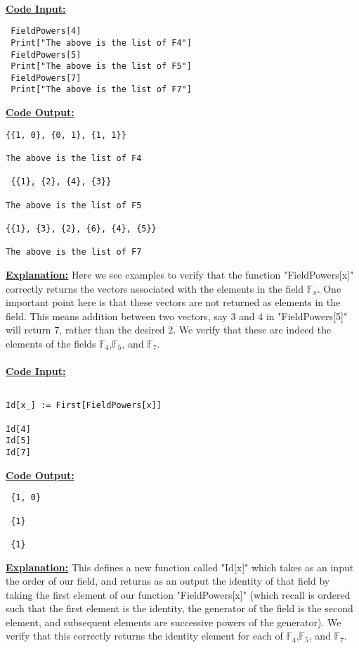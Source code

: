 \documentclass[11pt]{article}
\theoremstyle{plain}
\theoremstyle{definition}
\begin{document}
 \\
 \textbf{\underline{Code Input:}}
 \begin{verbatim}
 FieldPowers[4]
 Print["The above is the list of F4"]
 FieldPowers[5]
 Print["The above is the list of F5"]
 FieldPowers[7]
 Print["The above is the list of F7"]
 \end{verbatim}
 \textbf{\underline{Code Output:}}
 \begin{verbatim}
{{1, 0}, {0, 1}, {1, 1}}
 
The above is the list of F4
 
 {{1}, {2}, {4}, {3}}
 
The above is the list of F5
 
{{1}, {3}, {2}, {6}, {4}, {5}}
 
The above is the list of F7
 \end{verbatim}
 \textbf{\underline{Explanation:}} Here we see examples to verify that the function "FieldPowers[x]" correctly returns the vectors associated with the elements in the field $\mathbb{F}_x$. One important point here is that these vectors are not returned as elements in the field. This means addition between two vectors, say $3$ and $4$ in "FieldPowers[5]" will return $7$, rather than the desired $2$. We verify that these are indeed the elements of the fields $\mathbb{F}_4$,$\mathbb{F}_5$, and $\mathbb{F}_7$. \\
 \\
 \textbf{\underline{Code Input:}}
 \begin{verbatim}
 
Id[x_] := First[FieldPowers[x]]

Id[4]
Id[5]
Id[7]
 \end{verbatim}
 \textbf{\underline{Code Output:}}
 \begin{verbatim}
 {1, 0}
 
 {1}
 
 {1}
 \end{verbatim}
 \textbf{\underline{Explanation:}} This defines a new function called "Id[x]" which takes as an input the order of our field, and returns as an output the identity of that field by taking the first element of our function "FieldPowers[x]" (which recall is ordered such that the first element is the identity, the generator of the field is the second element, and subsequent elements are successive powers of the generator). We verify that this correctly returns the identity element for each of $\mathbb{F}_4$,$\mathbb{F}_5$, and $\mathbb{F}_7$.  \\
 \\
\end{document}
